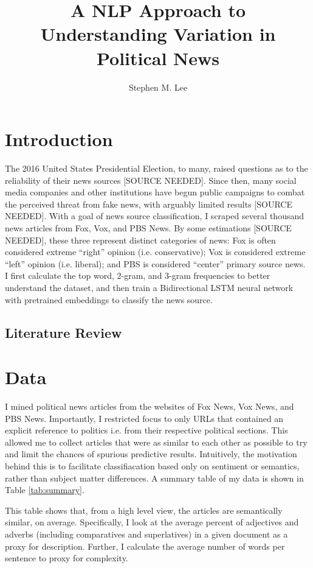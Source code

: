 \documentclass{article}
\author{Stephen M. Lee}
\title{A NLP Approach to Understanding Variation in Political News}
\begin{document}
	\maketitle 
	
	\newpage
	
	\tableofcontents
	
	\newpage
	
	\section{Introduction}
		The 2016 United States Presidential Election, to many, raised questions as to the reliability of their news sources [SOURCE NEEDED]. Since then, many social media companies and other institutions have begun public campaigns to combat the perceived threat from fake news, with arguably limited results [SOURCE NEEDED]. With a goal of news source classification, I scraped several thousand news articles from Fox, Vox, and PBS News. By some estimations [SOURCE NEEDED], these three represent distinct categories of news: Fox is often considered extreme “right” opinion (i.e. conservative); Vox is considered extreme “left” opinion (i.e. liberal); and PBS is considered “center” primary source news. I first calculate the top word, 2-gram, and 3-gram frequencies to better understand the dataset, and then train a Bidirectional LSTM neural network with pretrained embeddings to classify the news source. 
		\subsection{Literature Review}
	
	\section{Data}
	    I mined political news articles from the websites of Fox News, Vox News, and PBS News. Importantly, I restricted focus to only URLs that contained an explicit reference to politics i.e. from their respective political sections. This allowed me to collect articles that were as similar to each other as possible to try and limit the chances of spurious predictive results. Intuitively, the motivation behind this is to facilitate classifiacation based only on sentiment or semantics, rather than subject matter differences. A summary table of my data is shown in Table \ref{tab:summary}.  
 
    	
	    
	    This table shows that, from a high level view, the articles are semantically similar, on average. Specifically, I look at the average percent of adjectives and adverbs (including comparatives and superlatives) in a given document as a proxy for description. Further, I calculate the average number of words per sentence to proxy for complexity. 
	    
\end{document}
